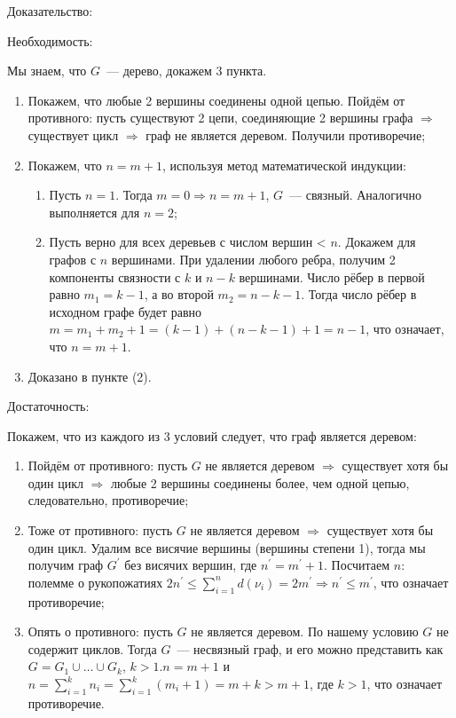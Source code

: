 Доказательство:
\bigskip

Необходимость:

Мы знаем, что $G$~--- дерево, докажем 3 пункта.

\begin{enumerate}
    \item{Покажем, что любые 2 вершины соединены одной цепью. Пойдём от противного:
    пусть существуют 2 цепи, соединяющие 2 вершины графа $\Rightarrow$ существует
    цикл $\Rightarrow$ граф не является деревом. Получили противоречие;}
    \item{Покажем, что $n = m + 1$, используя метод математической индукции:
    
    \begin{enumerate}
        \item{Пусть $n = 1$. Тогда $m = 0 \Rightarrow n = m + 1$, $G$~--- связный.
        Аналогично выполняется для $n = 2$;}
        \item{Пусть верно для всех деревьев с числом вершин < $n$. Докажем для
        графов с $n$ вершинами. При удалении любого ребра, получим 2 компоненты
        связности с $k$ и $n - k$ вершинами. Число рёбер в первой равно $m_1 = k - 1$,
        а во второй $m_2 = n - k - 1$. Тогда число рёбер в исходном графе будет равно
        $m = m_1 + m_2 + 1 = (k - 1) + (n - k - 1) + 1 = n - 1$, что означает,
        что $n = m + 1$.}
    \end{enumerate}}
    \item{Доказано в пункте (2).}
\end{enumerate}
\bigskip

Достаточность:

Покажем, что из каждого из 3 условий следует, что граф является деревом:

\begin{enumerate}
    \item{Пойдём от противного: пусть $G$ не является деревом $\Rightarrow$
    существует хотя бы один цикл $\Rightarrow$ любые 2 вершины соединены более,
    чем одной цепью, следовательно, противоречие;}
    \item{Тоже от противного: пусть $G$ не является деревом $\Rightarrow$
    существует хотя бы один цикл. Удалим все висячие вершины (вершины степени 1),
    тогда мы получим граф $G^{'}$ без висячих вершин, где $n^{'} = m^{'} + 1$.
    Посчитаем $n$: полемме о рукопожатиях $2 n^{'} \leq \sum\limits^{n}_{i = 1}
    d(\nu_i) = 2m^{'} \Rightarrow n^{'} \leq m^{'}$, что означает противоречие;}
    \item{Опять о противного: пусть $G$ не является деревом. По нашему условию
    $G$ не содержит циклов. Тогда $G$~--- несвязный граф, и его можно представить как
    $G = G_1 \cup \dots \cup G_k$, $k > 1. n = m + 1$ и $n = \sum\limits^k_{i = 1}
    n_i = \sum\limits^k_{i = 1} (m_i + 1) = m + k > m + 1$, где $k > 1$,
    что означает противоречие.}
\end{enumerate}


